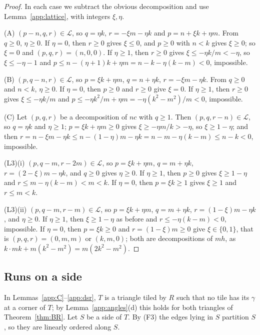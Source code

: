 \documentclass[11pt]{amsart}
\theoremstyle{remark}
\begin{document}
\begin{proof}
In each case we subtract the obvious decomposition and use Lemma~\ref{app:lattice}, with integers $\xi,\eta$.

(A) $(p-n,q,r)\in\mathcal{L}$, so $q=\eta k$, $r=-\xi m-\eta k$ and $p=n+\xi k+\eta m$. From $q\ge0$, $\eta\ge0$. If $\eta=0$, then $r\ge0$ gives $\xi\le0$, and $p\ge0$ with $n<k$ gives $\xi\ge0$; so $\xi=0$ and $(p,q,r)=(n,0,0)$. If $\eta\ge1$, then $r\ge0$ gives $\xi\le-\eta k/m<-\eta$, so $\xi\le-\eta-1$ and $p\le n-(\eta+1)k+\eta m=n-k-\eta(k-m)<0$, impossible.

(B) $(p,q-n,r)\in\mathcal{L}$, so $p=\xi k+\eta m$, $q=n+\eta k$, $r=-\xi m-\eta k$. From $q\ge0$ and $n<k$, $\eta\ge0$. If $\eta=0$, then $p\ge0$ and $r\ge0$ give $\xi=0$. If $\eta\ge1$, then $r\ge0$ gives $\xi\le-\eta k/m$ and $p\le-\eta k^2/m+\eta m=-\eta(k^2-m^2)/m<0$, impossible.

(C) Let $(p,q,r)$ be a decomposition of $nc$ with $q\ge1$. Then $(p,q,r-n)\in\mathcal{L}$, so $q=\eta k$ and $\eta\ge1$; $p=\xi k+\eta m\ge0$ gives $\xi\ge-\eta m/k>-\eta$, so $\xi\ge1-\eta$; and then $r=n-\xi m-\eta k\le n-(1-\eta)m-\eta k=n-m-\eta(k-m)\le n-k<0$, impossible.

(L3)(i) $(p,q-m,r-2m)\in\mathcal{L}$, so $p=\xi k+\eta m$, $q=m+\eta k$, $r=(2-\xi)m-\eta k$, and $q\ge0$ gives $\eta\ge0$. If $\eta\ge1$, then $p\ge0$ gives $\xi\ge1-\eta$ and $r\le m-\eta(k-m)<m<k$. If $\eta=0$, then $p=\xi k\ge1$ gives $\xi\ge1$ and $r\le m<k$.

(L3)(ii) $(p,q-m,r-m)\in\mathcal{L}$, so $p=\xi k+\eta m$, $q=m+\eta k$, $r=(1-\xi)m-\eta k$, and $\eta\ge0$. If $\eta\ge1$, then $\xi\ge1-\eta$ as before and $r\le-\eta(k-m)<0$, impossible. If $\eta=0$, then $p=\xi k\ge0$ and $r=(1-\xi)m\ge0$ give $\xi\in\{0,1\}$, that is $(p,q,r)=(0,m,m)$ or $(k,m,0)$; both are decompositions of $mh$, as $k\cdot mk+m(k^2-m^2)=m(2k^2-m^2)$.
\end{proof}

\subsection{Runs on a side}

In Lemmas~\ref{app:C}--\ref{app:dsr}, $T$ is a triangle tiled by $R$ such that no tile has its $\gamma$ at a corner of $T$; by Lemma~\ref{app:angles}(d) this holds for both triangles of Theorem~\ref{thm:BR}. Let $S$ be a side of $T$. By (F3) the edges lying in $S$ partition $S$, so they are linearly ordered along $S$.
\end{document}
